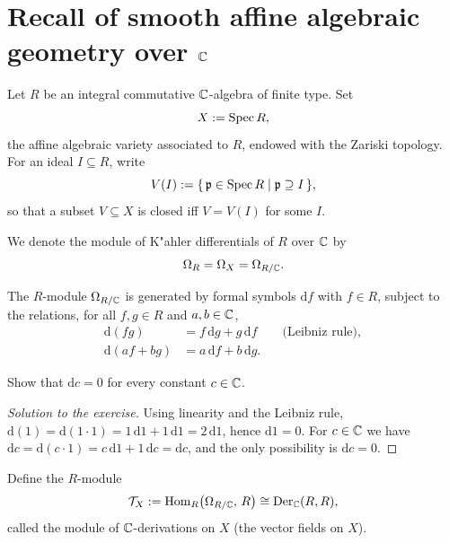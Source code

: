 \section{Recall of smooth affine algebraic geometry over $\mathbb{C}$}
Let $R$ be an integral commutative $\mathbb{C}$-algebra of finite type. Set
\[
    X := \operatorname{Spec} R,
\]
the affine algebraic variety associated to $R$, endowed with the Zariski topology.
For an ideal $I\subseteq R$, write
\[
    V(I) := \{\, \mathfrak p\in \operatorname{Spec} R \mid \mathfrak p\supseteq I \,\},
\]
so that a subset $V\subseteq X$ is closed iff $V=V(I)$ for some $I$.

We denote the module of K"ahler differentials of $R$ over $\mathbb{C}$ by
\[
    \Omega_R = \Omega_X = \Omega_{R/\mathbb{C}}.
\]
\begin{definition}\label{def:kahler}
    The $R$-module $\Omega_{R/\mathbb{C}}$ is generated by formal symbols $\mathrm df$ with $f\in R$,
    subject to the relations, for all $f,g\in R$ and $a,b\in\mathbb{C}$,
    \begin{align*}
        \mathrm d(fg)    & = f\,\mathrm dg + g\,\mathrm df \qquad\text{(Leibniz rule)}, \\
        \mathrm d(af+bg) & = a\,\mathrm df + b\,\mathrm dg.
    \end{align*}
\end{definition}
\begin{exercise}
    Show that $\mathrm dc=0$ for every constant $c\in\mathbb{C}$.
\end{exercise}
\begin{proof}[Solution to the exercise]
    Using linearity and the Leibniz rule,
    \(\mathrm d(1)=\mathrm d(1\cdot 1)=1\,\mathrm d1+1\,\mathrm d1=2\,\mathrm d1\), hence
    \(\mathrm d1=0\). For $c\in\mathbb{C}$ we have
    \(\mathrm dc=\mathrm d(c\cdot 1)=c\,\mathrm d1+1\,\mathrm dc=\mathrm dc\), and the only possibility is
    \(\mathrm dc=0\).
\end{proof}

Define the $R$-module
\[
    \mathcal{T}_X := \operatorname{Hom}_R\!\big(\Omega_{R/\mathbb{C}},\, R\big) \cong \operatorname{Der}_{\mathbb{C}}(R,R),
\]
called the module of $\mathbb{C}$-derivations on $X$ (the vector fields on $X$).

